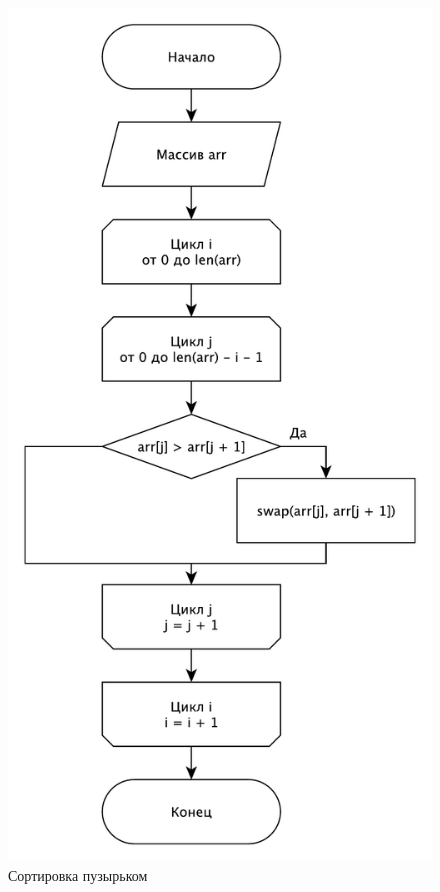 \documentclass[a4paper,12pt]{article}
\begin{document}
\begin{figure}[H]
    \centering
    \includegraphics[scale=0.55]{Bubble}
    \caption{Сортировка пузырьком}
    \label{img:bubble}
\end{figure}
\end{document}

